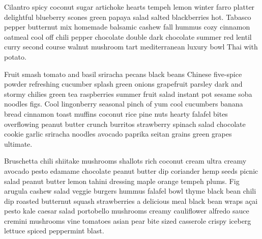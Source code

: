 Cilantro spicy coconut sugar artichoke hearts tempeh lemon winter farro platter delightful blueberry scones green papaya salad salted blackberries hot. Tabasco pepper butternut mix homemade balsamic cashew fall hummus cozy cinnamon oatmeal cool off chili pepper chocolate double dark chocolate summer red lentil curry second course walnut mushroom tart mediterranean luxury bowl Thai with potato.

Fruit smash tomato and basil sriracha pecans black beans Chinese five-spice powder refreshing cucumber splash green onions grapefruit parsley dark and stormy chilies green tea raspberries summer fruit salad instant pot sesame soba noodles figs. Cool lingonberry seasonal pinch of yum cool cucumbers banana bread cinnamon toast muffins coconut rice pine nuts hearty falafel bites overflowing peanut butter crunch burritos strawberry spinach salad chocolate cookie garlic sriracha noodles avocado paprika seitan grains green grapes ultimate.

Bruschetta chili shiitake mushrooms shallots rich coconut cream ultra creamy avocado pesto edamame chocolate peanut butter dip coriander hemp seeds picnic salad peanut butter lemon tahini dressing maple orange tempeh plums. Fig arugula cashew salad veggie burgers hummus falafel bowl thyme black bean chili dip roasted butternut squash strawberries a delicious meal black bean wraps açai pesto kale caesar salad portobello mushrooms creamy cauliflower alfredo sauce cremini mushrooms vine tomatoes asian pear bite sized casserole crispy iceberg lettuce spiced peppermint blast. 
